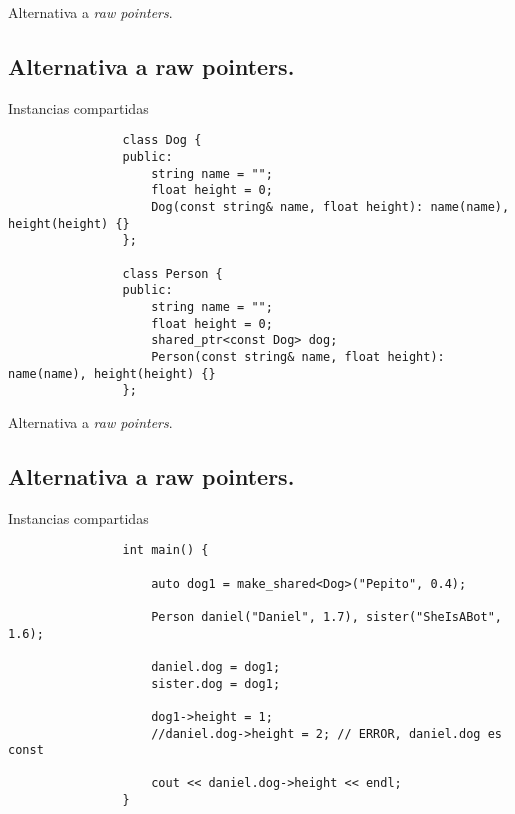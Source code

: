 \documentclass{beamer}
\newcommand{\normalSizeItem}[1] {
  \normalsize{\item #1}
}
\begin{document}
		\begin{frame}[fragile]{Alternativa a \textit{raw pointers}. }	
			\subsection{Alternativa a raw pointers. }
	
			\begin{itemize}
			
				\normalSizeItem { Instancias compartidas }
				\begin{lstlisting}
				class Dog {
				public:
					string name = "";
					float height = 0;	
					Dog(const string& name, float height): name(name), height(height) {}
				};
				
				class Person {
				public:
					string name = "";
					float height = 0;
					shared_ptr<const Dog> dog;
					Person(const string& name, float height): name(name), height(height) {}
				};
				\end{lstlisting}				
			\end{itemize}
		\end{frame}
		
		\begin{frame}[fragile]{Alternativa a \textit{raw pointers}. }	
			\subsection{Alternativa a raw pointers. }
	
			\begin{itemize}
			
				\normalSizeItem { Instancias compartidas }
				\begin{lstlisting}
				int main() {

					auto dog1 = make_shared<Dog>("Pepito", 0.4);
					
					Person daniel("Daniel", 1.7), sister("SheIsABot", 1.6);
					
					daniel.dog = dog1;
					sister.dog = dog1;
					
					dog1->height = 1;
					//daniel.dog->height = 2; // ERROR, daniel.dog es const
					
					cout << daniel.dog->height << endl;
				}
				\end{lstlisting}				
			\end{itemize}
		\end{frame}
		
\end{document}
